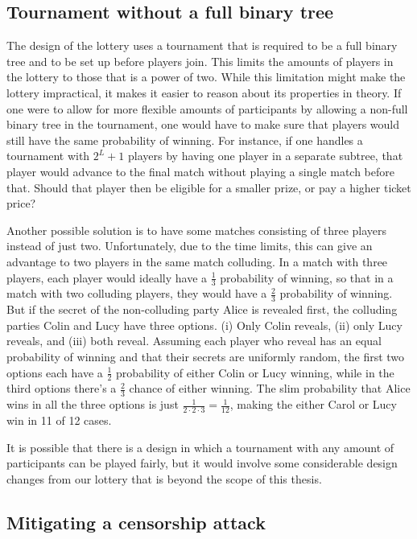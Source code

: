 \subsection{Tournament without a full binary tree}

The design of the lottery uses a tournament that is required to be a full binary tree and to be set up before players join. This limits the amounts of players in the lottery to those that is a power of two. While this limitation might make the lottery impractical, it makes it easier to reason about its properties in theory. If one were to allow for more flexible amounts of participants by allowing a non-full binary tree in the tournament, one would have to make sure that players would still have the same probability of winning. For instance, if one handles a tournament with $2^L+1$ players by having one player in a separate subtree, that player would advance to the final match without playing a single match before that. Should that player then be eligible for a smaller prize, or pay a higher ticket price?

Another possible solution is to have some matches consisting of three players instead of just two. Unfortunately, due to the time limits, this can give an advantage to two players in the same match colluding. In a match with three players, each player would ideally have a $\frac{1}{3}$ probability of winning, so that in a match with two colluding players, they would have a $\frac{2}{3}$ probability of winning. But if the secret of the non-colluding party Alice is revealed first, the colluding parties Colin and Lucy have three options. (i) Only Colin reveals, (ii) only Lucy reveals, and (iii) both reveal. Assuming each player who reveal has an equal probability of winning and that their secrets are uniformly random, the first two options each have a $\frac{1}{2}$ probability of either Colin or Lucy winning, while in the third options there's a $\frac{2}{3}$ chance of either winning. The slim probability that Alice wins in all the three options is just $\frac{1}{2 \cdot 2 \cdot 3}=\frac{1}{12}$, making the either Carol or Lucy win in 11 of 12 cases.

It is possible that there is a design in which a tournament with any amount of participants can be played fairly, but it would involve some considerable design changes from our lottery that is beyond the scope of this thesis.

\subsection{Mitigating a censorship attack}

